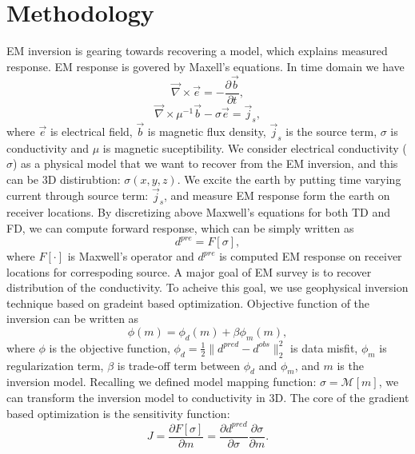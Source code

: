 \documentclass{segabs}
\newcommand{\curl}{{\vec \nabla}\times}
\newcommand {\J}{{\vec J}}
\newcommand {\E}{{\vec E}}
\newcommand{\B}{\vec{B}}
\renewcommand {\j}  { {\vec j} }
\renewcommand {\b}  { {\vec b} }
\newcommand {\e}  { {\vec e} }
\newcommand{\dbdt}{\frac{\partial \b}{\partial t}}
\begin{document}
\section*{Methodology}
EM inversion is gearing towards recovering a model, which explains measured response. EM response is govered by Maxell's equations.  In time domain we have
\begin{equation}
  \curl \e = -\dbdt,
\end{equation}
\begin{equation}
  \curl \mu^{-1}\b -\sigma \e = \j_s,
\end{equation}
where $\e$ is electrical field, $\b$ is magnetic flux density, $\j_s$ is the source term, $\sigma$ is conductivity and $\mu$ is magnetic suceptibility.
We consider electrical conductivity ($\sigma$) as a physical model that we want to recover from the EM inversion, and this can be 3D distirubtion: $\sigma(x, y, z)$. We excite the earth by putting time varying current through source term: $\j_s$, and measure EM response form the earth on receiver locations. By discretizing above Maxwell's equations for both TD and FD, we can compute forward response, which can be simply written as 
\begin{equation}
  d^{pre} = F[\sigma], 
\end{equation}
where $F[\cdot]$ is Maxwell's operator and $d^{pre}$ is computed EM response on receiver locations for correspoding source.
A major goal of EM survey is to recover distribution of the conductivity. To acheive this goal, we use geophysical inversion technique based on gradeint based optimization. Objective function of the inversion can be written as 
\begin{equation}
  \phi(m) = \phi_d(m) + \beta\phi_m(m),
\end{equation}
where $\phi$ is the objective function, $\phi_d=\frac{1}{2}\|d^{pred}-d^{obs}\|^2_2$ is data misfit, $\phi_m$ is regularization term, $\beta$ is trade-off term between $\phi_d$ and $\phi_m$, and $m$ is the inversion model. Recalling we defined model mapping function: $\sigma = \mathcal{M}[m]$, we can transform the inversion model to conductivity in 3D. The core of the gradient based optimization is the sensitivity function:
\begin{equation}
  J = \frac{\partial F[\sigma]}{\partial m} = \frac{\partial d^{pred}}{\partial \sigma}\frac{\partial \sigma}{\partial m}.
\end{equation}
\end{document}
